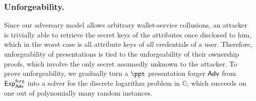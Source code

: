 
\subsubsection{Unforgeability.}
Since our adversary model allows arbitrary wallet-service collusions, an attacker is trivially able to retrieve the secret keys of the attributes once disclosed to him, which in the worst case is all attribute keys of all  credentials of a user.
Therefore, unforgeability of presentations is tied to the unforgeability of their ownership proofs, which involve the only secret assumedly unknown to the attacker.
To prove unforgeability, we gradually turn a $\ppt$ presentation forger $\mathsf{Adv}$ from $\operatorname{\mathsf{Exp}_{\mathsf{Adv}}^{forg}}$ into a solver for the discrete logarithm problem in $\mathbb G$, which succeeds on one out of polynomially many random instances.

